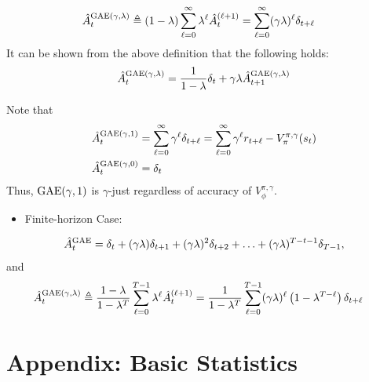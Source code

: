 \documentclass{article}
\begin{document}
\begin{align*}
    \hat A_t^{\rm{GAE}(\gamma,\lambda)} &\triangleq (1-\lambda) \sum_{\ell = 0}^\infty \lambda^{\ell} \hat A_t^{(\ell + 1)}  = \sum_{\ell = 0}^\infty (\gamma \lambda)^{\ell} \delta_{t+\ell}
\end{align*}
It can be shown from the above definition that the following holds:
\begin{align*}
     \hat A_t^{\rm{GAE}(\gamma,\lambda)} = \frac{1}{1-\lambda}\delta_t + \gamma \lambda \hat A_{t+1}^{\rm{GAE}(\gamma,\lambda)}
\end{align*}

Note that 
\begin{align*}
    \hat A_t^{\rm{GAE}(\gamma,1)} &= \sum_{\ell = 0}^\infty \gamma^\ell \delta_{t+\ell} = \sum_{\ell = 0}^\infty \gamma^\ell r_{t+\ell} - V_\pi^{\pi, \gamma}(s_t)\\
    \hat A_t^{\rm{GAE}(\gamma,0)} &= \delta_t
\end{align*}
Thus, $\rm{GAE}(\gamma, 1)$ is $\gamma$-just regardless of accuracy of $V_\phi^{\pi, \gamma}$.

\begin{itemize}
     \item Finite-horizon Case:
\end{itemize}
\begin{align*}
\hat{A}_t^{\rm GAE} = \delta_t + (\gamma \lambda) \delta_{t+1} + (\gamma \lambda)^2 \delta_{t+2} + \ldots + (\gamma \lambda)^{T-t-1} \delta_{T-1},
\end{align*}
and
\begin{align*}
    \hat A_t^{\rm{GAE}(\gamma,\lambda)} &\triangleq \frac{1 - \lambda}{1 - \lambda^T} \sum_{\ell=0}^{T-1} \lambda^\ell \hat A_t^{(\ell+1)} = \frac{1}{1 - \lambda^T}\sum_{\ell=0}^{T-1} (\gamma \lambda)^\ell \left(1 - \lambda^{T-\ell}\right)\delta_{t+\ell}
\end{align*}



\newpage
\section{Appendix: Basic Statistics}\label{apx:basic_statistics}
\end{document}
